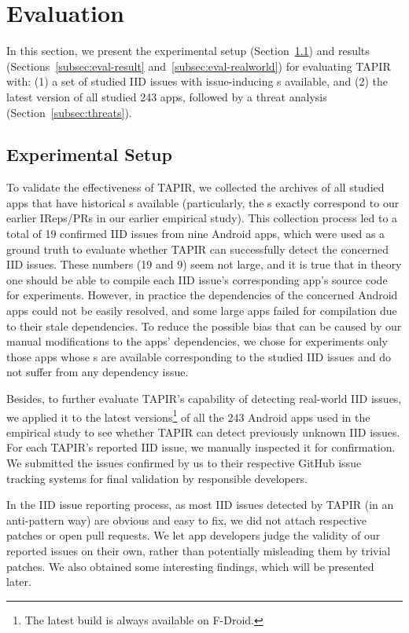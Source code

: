 \section{Evaluation} \label{sec:evaluation}

In this section, we present the experimental setup (Section~\ref{subsec:eval-setup}) and results (Sections~\ref{subsec:eval-result} and~\ref{subsec:eval-realworld}) for evaluating TAPIR with:
(1) a set of studied IID issues with issue-inducing s available, and
(2) the latest version of all studied 243 apps,
followed by a threat analysis (Section~\ref{subsec:threats}).

\subsection{Experimental Setup} \label{subsec:eval-setup}

To validate the effectiveness of TAPIR,
we collected the  archives of all studied apps that have historical s available
(particularly, the s exactly correspond to our earlier IReps/PRs in our earlier empirical study).
This collection process led to a total of 19 confirmed IID issues from nine Android apps, which were used as a ground truth to evaluate whether TAPIR can successfully detect the concerned IID issues.
These numbers (19 and 9) seem not large, and it is true that in theory one should be able to compile each IID issue's corresponding app's source code for experiments. However, in practice the dependencies of the concerned Android apps could not be easily resolved, and some large apps failed for compilation due to their stale dependencies.
To reduce the possible bias that can be caused by our manual modifications to the apps' dependencies, we chose for experiments only those apps whose s are available corresponding to the studied IID issues and do not suffer from any dependency issue.

Besides, to further evaluate TAPIR's capability of detecting real-world IID issues,
we applied it to the latest versions\footnote{The latest  build is always available on F-Droid.} of all the 243 Android apps used in the empirical study
to see whether TAPIR can detect previously unknown IID issues. For each TAPIR's reported IID issue, 
we manually inspected it for confirmation. We submitted the issues confirmed by us to their respective GitHub issue tracking systems for final validation by responsible developers.

In the IID issue reporting process, as most IID issues detected by TAPIR (in an anti-pattern way) are obvious and easy to fix, we did not attach respective patches or open pull requests. We let app developers judge the validity of our reported issues on their own, rather than potentially misleading them by trivial patches. We also obtained some interesting findings, which will be presented later.

